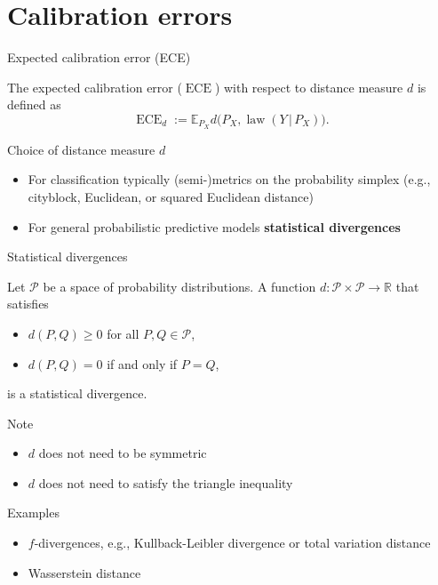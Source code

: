 \documentclass[aspectratio=169,hyperref={pdfpagelabels=false,pageanchor=false,bookmarks=false}]{beamer}
\newcommand\hl[1]{\begingroup\bfseries\boldmath\color{red}#1\endgroup}
\DeclareMathOperator{\law}{law}
\begin{document}
\section{Calibration errors}
\frame{\sectionpage}

\begin{frame}{Expected calibration error (ECE)}
  \begin{definition}
    The expected calibration error ($\operatorname{ECE}$) with respect to
    distance measure $d$ is defined as
    \begin{equation*}
      \operatorname{ECE}_d := \mathbb{E}_{P_X} d\big(P_X, \law(Y\,|\, P_X)\big).
    \end{equation*}
  \end{definition}
  \pause
  \begin{block}{Choice of distance measure $d$}
    \begin{itemize}[<+->]
      \item For classification typically (semi-)metrics on the probability simplex
            (e.g., cityblock, Euclidean, or squared Euclidean distance)
      \item For general probabilistic predictive models \hl{statistical divergences}
    \end{itemize}
  \end{block}
\end{frame}

\begin{frame}{Statistical divergences}
  \begin{definition}
    Let $\mathcal{P}$ be a space of probability distributions.
    A function $d \colon \mathcal{P} \times \mathcal{P} \to \mathbb{R}$ that satisfies
    \begin{itemize}
      \item $d(P, Q) \geq 0$ for all $P, Q \in \mathcal{P}$,
      \item $d(P, Q) = 0$ if and only if $P = Q$,
    \end{itemize}
    is a statistical divergence.
  \end{definition}
  \pause
  \begin{block}{Note}
    \begin{itemize}
      \item $d$ does not need to be symmetric
      \item $d$ does not need to satisfy the triangle inequality
    \end{itemize}
  \end{block}
  \pause
  \begin{block}{Examples}
    \begin{itemize}
      \item $f$-divergences, e.g., Kullback-Leibler divergence or total variation distance
      \item Wasserstein distance
    \end{itemize}
  \end{block}
\end{frame}
\end{document}
